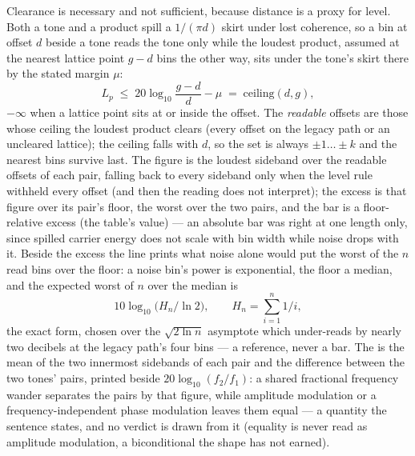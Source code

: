 \documentclass[11pt,a4paper]{article}
\begin{document}
Clearance is necessary and not sufficient, because distance is a proxy
for level. Both a tone and a product spill a $1/(\pi d)$ skirt under lost
coherence, so a bin at offset $d$ beside a tone reads the tone only while
the loudest product, assumed at the nearest lattice point $g - d$ bins the
other way, sits under the tone's skirt there by the stated margin $\mu$:
\begin{equation}
  L_p \;\le\; 20\log_{10}\!\frac{g - d}{d} - \mu \;=\; \mathrm{ceiling}(d, g),
  \label{eq:ceiling}
\end{equation}
$-\infty$ when a lattice point sits at or inside the offset. The
\emph{readable} offsets are those whose ceiling the loudest product clears
(every offset on the legacy path or an uncleared lattice); the ceiling
falls with $d$, so the set is always $\pm 1 \ldots \pm k$ and the nearest
bins survive last. The figure is the loudest sideband over the readable
offsets of each pair, falling back to every sideband only when the level
rule withheld every offset (and then the reading does not interpret); the
excess is that figure over its pair's floor, the worst over the two
pairs, and the bar is a floor-relative excess (the table's value) --- an
absolute bar was right at one length only, since spilled carrier energy
does not scale with bin width while noise drops with it. Beside the
excess the line prints what noise alone would put the worst of the $n$
read bins over the floor: a noise bin's power is exponential, the floor a
median, and the expected worst of $n$ over the median is
\begin{equation}
  10\log_{10}\!\big(H_n/\ln 2\big),\qquad H_n = \textstyle\sum_{i=1}^{n} 1/i,
  \label{eq:noiseexcess}
\end{equation}
the exact form, chosen over the $\sqrt{2\ln n}$ asymptote which under-reads
by nearly two decibels at the legacy path's four bins --- a reference,
never a bar. The  is the mean of the two innermost
sidebands of each pair and the difference between the two tones' pairs,
printed beside $20\log_{10}(f_2/f_1)$: a shared fractional frequency
wander separates the pairs by that figure, while amplitude modulation or a
frequency-independent phase modulation leaves them equal --- a quantity
the sentence states, and no verdict is drawn from it (equality is never
read as amplitude modulation, a biconditional the shape has not earned).
\end{document}
